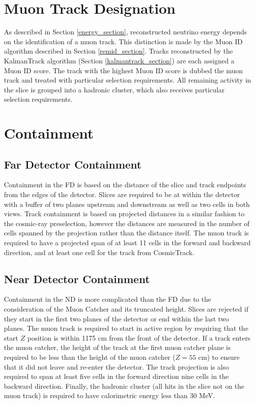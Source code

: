 \section{Muon Track Designation}

As described in Section \ref{energy_section}, reconstructed neutrino
energy depends on the identification of a muon track.
This distinction is made by the Muon ID algorithm described in Section
\ref{remid_section}.
Tracks reconstructed by the KalmanTrack algorithm
(Section \ref{kalmantrack_section}) are each assigned a Muon ID
score.
The track with the highest Muon ID score is dubbed the muon track
and treated with particular selection requirements.
All remaining activity in the slice is grouped into a hadronic
cluster, which also receives particular selection requirements.


\section{Containment}

\subsection{Far Detector Containment}

Containment in the FD is based on the distance of the slice and track
endpoints from the edges of the detector.
Slices are required to be at within the detector with a buffer of two
planes upstream and downstream as well as two cells in both views.
Track containment is based on projected distances in a similar fashion
to the cosmic-ray preselection, however the distances are measured in
the number of cells spanned by the projection rather than the distance itself.
The muon track is required to have a projected span of at least
11 cells in the forward and backward direction, and at least one cell
for the track from CosmicTrack.

\subsection{Near Detector Containment}

Containment in the ND is more complicated than the FD due to the consideration
of the Muon Catcher and its truncated height.
Slices are rejected if they start in the first two planes of the detector or
end within the last two planes.
The muon track is required to start in active region by requiring that
the start $Z$ position is within 1175 cm from the front of the detector.
If a track enters the muon catcher, the height of the track
at the first muon catcher plane is required to be less than the height of
the muon catcher ($Z = 55$ cm) to ensure that it did not leave and re-enter
the detector.
The track projection is also required to span at least five cells in the
forward direction nine cells in the backward direction.
Finally, the hadronic cluster (all hits in the slice not on the muon track)
is required to have calorimetric energy less than 30 MeV.


